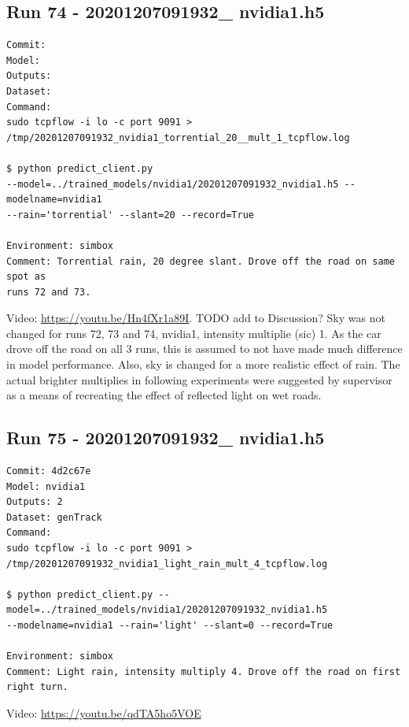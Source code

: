 \subsection{Run 74 - 20201207091932\_ nvidia1.h5}
\label{app_res:74}
\begin{verbatim}
Commit: 
Model: 
Outputs: 
Dataset: 
Command:
sudo tcpflow -i lo -c port 9091 >
/tmp/20201207091932_nvidia1_torrential_20__mult_1_tcpflow.log

$ python predict_client.py
--model=../trained_models/nvidia1/20201207091932_nvidia1.h5 --modelname=nvidia1
--rain='torrential' --slant=20 --record=True

Environment: simbox
Comment: Torrential rain, 20 degree slant. Drove off the road on same spot as
runs 72 and 73.
\end{verbatim}
Video: \url{https://youtu.be/Hn4fXr1a89I}. TODO add to Discussion? Sky was not changed for runs 72, 73 and 74, nvidia1, intensity multiplie (sic) 1. As the car drove off the road on all 3 runs, this is assumed to not have made much difference in model performance. Also, sky is changed for a more realistic effect of rain. The actual brighter multiplies in following experiments were suggested by supervisor as a means of recreating the effect of reflected light on wet roads.

\subsection{Run 75 - 20201207091932\_ nvidia1.h5 }
\label{app_res:75}
\begin{verbatim}
Commit: 4d2c67e
Model: nvidia1
Outputs: 2
Dataset: genTrack
Command:
sudo tcpflow -i lo -c port 9091 > /tmp/20201207091932_nvidia1_light_rain_mult_4_tcpflow.log

$ python predict_client.py --model=../trained_models/nvidia1/20201207091932_nvidia1.h5
--modelname=nvidia1 --rain='light' --slant=0 --record=True

Environment: simbox
Comment: Light rain, intensity multiply 4. Drove off the road on first right turn.
\end{verbatim}
Video: \url{https://youtu.be/qdTA5ho5VOE}

